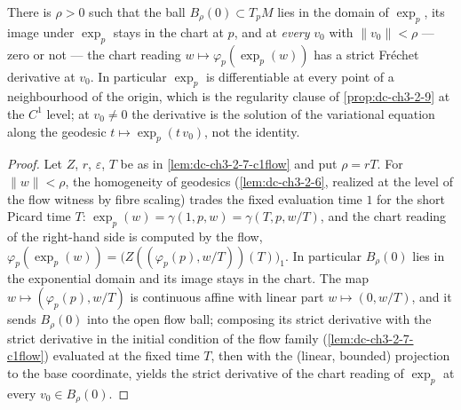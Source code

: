\begin{lemma}
  \label{lem:dc-ch3-2-9-c1ball}
  \leanok
  There is $\rho > 0$ such that the ball $B_\rho(0) \subset T_pM$ lies in the
  domain of $\exp_p$, its image under $\exp_p$ stays in the chart at $p$, and
  at \emph{every} $v_0$ with $\|v_0\| < \rho$ — zero or not — the chart
  reading $w \mapsto \varphi_p(\exp_p(w))$ has a strict Fr\'echet derivative
  at $v_0$. In particular $\exp_p$ is differentiable at every point of a
  neighbourhood of the origin, which is the regularity clause of
  \cref{prop:dc-ch3-2-9} at the $C^1$ level; at $v_0 \ne 0$ the derivative is
  the solution of the variational equation along the geodesic
  $t \mapsto \exp_p(t\,v_0)$, not the identity.
\end{lemma}
\begin{proof}
  \sketch
  \leanok
  Let $Z$, $r$, $\varepsilon$, $T$ be as in \cref{lem:dc-ch3-2-7-c1flow} and
  put $\rho = rT$. For $\|w\| < \rho$, the homogeneity of geodesics
  (\cref{lem:dc-ch3-2-6}, realized at the level of the flow witness by fibre
  scaling) trades the fixed evaluation time $1$ for the short Picard time
  $T$: $\exp_p(w) = \gamma(1, p, w) = \gamma(T, p, w/T)$, and the chart
  reading of the right-hand side is computed by the flow,
  $\varphi_p(\exp_p(w)) = \big(Z((\varphi_p(p), w/T))(T)\big)_1$. In
  particular $B_\rho(0)$ lies in the exponential domain and its image stays
  in the chart. The map $w \mapsto (\varphi_p(p), w/T)$ is continuous affine
  with linear part $w \mapsto (0, w/T)$, and it sends $B_\rho(0)$ into the
  open flow ball; composing its strict derivative with the strict derivative
  in the initial condition of the flow family (\cref{lem:dc-ch3-2-7-c1flow})
  evaluated at the fixed time $T$, then with the (linear, bounded) projection
  to the base coordinate, yields the strict derivative of the chart reading
  of $\exp_p$ at every $v_0 \in B_\rho(0)$.
\end{proof}


